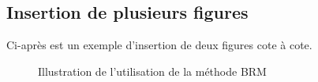 \subsection{Insertion de plusieurs figures}

Ci-après est un exemple d'insertion de deux figures cote à cote.

        \begin{figure}[!h]
		\begin{center}
			\hfill
			\hfill
			\caption{Illustration de l'utilisation de la méthode BRM}
			\label{org-brm}
		\end{center}
	\end{figure}

